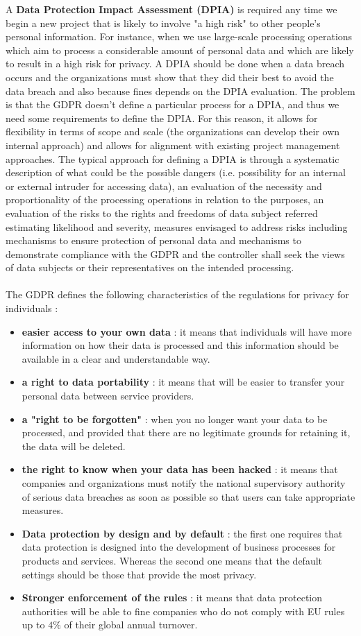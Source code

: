 A \textbf{Data Protection Impact Assessment (DPIA)} is required any time we begin a new project that is likely to involve "a high risk" to other people's personal information. For instance, when we use large-scale processing operations which aim to process a considerable amount of personal data and which are likely to result in a high risk for privacy. A DPIA should be done when a data breach occurs and the organizations must show that they did their best to avoid the data breach and also because fines depends on the DPIA evaluation. The problem is that the GDPR doesn't define a particular process for a DPIA, and thus we need some requirements to define the DPIA. For this reason, it allows for flexibility in terms of scope and scale (the organizations can develop their own internal approach) and allows for alignment with existing project management approaches. The typical approach for defining a DPIA is through a systematic description of what could be the possible dangers (i.e. possibility for an internal or external intruder for accessing data), an evaluation of the necessity and proportionality of the processing operations in relation to the purposes, an evaluation of the risks to the rights and freedoms of data subject referred estimating likelihood and severity, measures envisaged to address risks including mechanisms to ensure protection of personal data and mechanisms to demonstrate compliance with the GDPR and the controller shall seek the views of data subjects or their representatives on the intended processing.\\\\The GDPR defines the following characteristics of the regulations for privacy for individuals :
\begin{itemize}
\item \textbf{easier access to your own data} : it means that individuals will have more information on how their data is processed and this information should be available in a clear and understandable way.
\item \textbf{a right to data portability} : it means that will be easier to transfer your personal data between service providers.
\item \textbf{a "right to be forgotten"} : when you no longer want your data to be processed, and provided that there are no legitimate grounds for retaining it, the data will be deleted.
\item \textbf{the right to know when your data has been hacked} : it means that companies and organizations must notify the national supervisory authority of serious data breaches as soon as possible so that users can take appropriate measures.
\item \textbf{Data protection by design and by default} : the first one requires that data protection is designed into the development of business processes for products and services. Whereas the second one means that the default settings should be those that provide the most privacy.
\item \textbf{Stronger enforcement of the rules} : it means that data protection authorities will be able to fine companies who do not comply with EU rules up to $4 \%$ of their global annual turnover.
\end{itemize}
